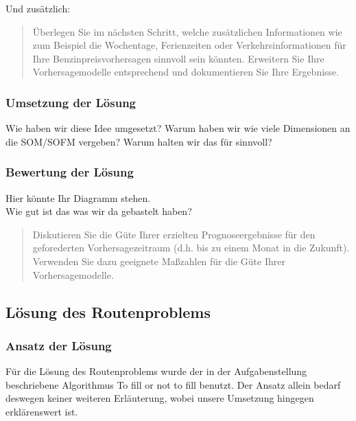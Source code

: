\documentclass[11pt]{article}
\begin{document}
	Und zusätzlich:
	\begin{quote}
		Überlegen Sie im nächsten Schritt, welche zusätzlichen Informationen wie zum Beispiel die Wochentage, Ferienzeiten oder Verkehrsinformationen für Ihre Benzinpreisvorhersagen sinnvoll sein könnten. Erweitern Sie Ihre Vorhersagemodelle entsprechend und dokumentieren Sie Ihre Ergebnisse.
	\end{quote}
\subsubsection{Umsetzung der Lösung}
	Wie haben wir diese Idee umgesetzt? Warum haben wir wie viele Dimensionen an die SOM/SOFM vergeben? Warum halten wir das für sinnvoll?
\subsubsection{Bewertung der Lösung}
	Hier könnte Ihr Diagramm stehen. \\
	Wie gut ist das was wir da gebastelt haben?
	\begin{quote}
		Diskutieren Sie die Güte Ihrer erzielten Prognoseergebnisse für den geforederten Vorhersagezeitraum (d.h. bis zu einem Monat in die Zukunft). Verwenden Sie dazu geeignete Maßzahlen für die Güte Ihrer Vorhersagemodelle. 
	\end{quote}
\subsection{Lösung des Routenproblems}
\subsubsection{Ansatz der Lösung}
	Für die Lösung des Routenproblems wurde der in der Aufgabenstellung beschriebene Algorithmus \glqq To fill or not to fill\glqq{} benutzt. Der Ansatz allein bedarf deswegen keiner weiteren Erläuterung, wobei unsere Umsetzung hingegen erklärenswert ist.
\end{document}
